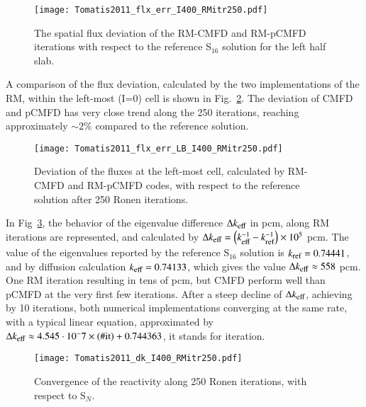 \begin{figure}[!hbtp]
	\centering
	\texttt{[image: Tomatis2011\_flx\_err\_I400\_RMitr250.pdf]}
	\caption{The spatial flux deviation of the RM-CMFD and RM-pCMFD iterations with respect to the reference S$_{16}$ solution for the left half slab.}
	\label{fig:flx_err_homg}
\end{figure}

A comparison of the flux deviation, calculated by the two implementations of the RM, within the left-most (I=0) cell is shown in Fig.~\ref{fig:slab-fluxes-dev-LB}. The deviation of CMFD and pCMFD has very close trend along the 250 iterations, reaching approximately $\sim 2\%$ compared to the reference solution.

\begin{figure}[!htbp]
	\centering
	\texttt{[image: Tomatis2011\_flx\_err\_LB\_I400\_RMitr250.pdf]}
	\caption{Deviation of the fluxes at the left-most cell, calculated by RM-CMFD and RM-pCMFD codes, with respect to the reference solution after 250 Ronen iterations.}
	\label{fig:slab-fluxes-dev-LB}
\end{figure}


In Fig~\ref{fig:rho_homg}, the behavior of the eigenvalue difference $\Delta\keff$ in pcm, along RM iterations are represented, and calculated by $\Delta\keff = \left(\keff^{-1}-\kref^{-1}\right)\times 10^5$ pcm. The value of the eigenvalues reported by the reference S$_{16}$ solution is  $\kref = 0.74441$,  and by diffusion calculation $\keff = 0.74133$, which gives the value $\Delta\keff \approx 558$ pcm. One RM iteration resulting in tens of pcm, but CMFD perform well than pCMFD at the very first few iterations. After a steep decline of $\Delta\keff$, achieving by 10 iterations, both numerical implementations converging at the same rate, with a typical linear equation, approximated by $\Delta\keff \approx 4.545\cdot 10^-7 \times (\#\text{it}) + 0.744363$, it stands for iteration.

\begin{figure}[!htbp]
	\centering
	\texttt{[image: Tomatis2011\_dk\_I400\_RMitr250.pdf]}	
	\caption{Convergence of the reactivity along 250 Ronen iterations, with respect to S$_N$.}
	\label{fig:rho_homg}
\end{figure}


